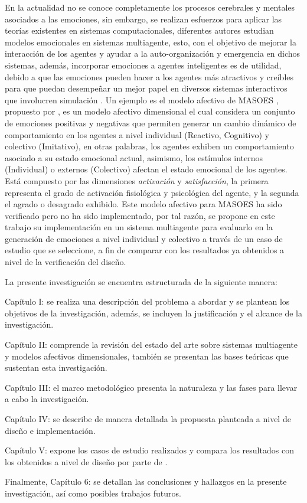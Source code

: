 En la actualidad no se conoce completamente los procesos cerebrales y mentales
asociados a las emociones, sin embargo, se realizan esfuerzos para aplicar las
teorías existentes en sistemas computacionales, diferentes autores estudian
modelos emocionales en sistemas multiagente, esto, con el objetivo de mejorar la
interacción de los agentes y ayudar a la auto-organización y emergencia en
dichos sistemas, además, incorporar emociones a agentes inteligentes
es de utilidad, debido a que las
emociones pueden hacer a los agentes más atractivos y creíbles para que puedan
desempeñar un mejor papel en diversos sistemas interactivos que involucren
simulación \citep{jiang2007}.
Un ejemplo es el modelo afectivo de MASOES , propuesto por
\cite{perozo2011}, es un modelo afectivo dimensional el cual considera un conjunto de emociones positivas y
negativas que permiten generar un cambio dinámico de comportamiento en los
agentes a nivel individual (Reactivo, Cognitivo) y colectivo (Imitativo), en
otras palabras, los agentes exhiben un comportamiento asociado a su estado
emocional actual, asimismo, los estímulos internos (Individual) o externos
(Colectivo) afectan el estado emocional de los agentes.
Está compuesto por las dimensiones \textit{activación} y \textit{satisfacción},
la primera representa el grado de activación fisiológica y psicológica del agente,
y la segunda el agrado o desagrado exhibido. Este modelo afectivo
para MASOES ha sido verificado \citep{perozo2011} pero no ha sido implementado,
por tal razón, se propone en este trabajo su implementación en un sistema
multiagente para evaluarlo en la generación de emociones a nivel individual y
colectivo a través de un caso de estudio que se seleccione, a fin de comparar
con los resultados ya obtenidos a nivel de la verificación del diseño.

La presente investigación se encuentra estructurada de la siguiente manera:

Capítulo I: se realiza una descripción del problema a abordar
y se plantean los objetivos de la investigación, además, se incluyen la
justificación y el alcance de la investigación.

Capítulo II: comprende la revisión del estado del arte
sobre sistemas multiagente y modelos afectivos dimensionales, también se presentan las bases
teóricas que sustentan esta investigación.

Capítulo III: el marco metodológico presenta la naturaleza y las fases para llevar a cabo la
investigación.

Capítulo IV: se describe de manera detallada la propuesta planteada a nivel
de diseño e implementación.

Capítulo V: expone los casos de estudio realizados y compara los resultados con los obtenidos a nivel de diseño
por parte de \cite{perozo2011}.

Finalmente, Capítulo 6: se detallan las conclusiones y hallazgos en la presente investigación, así
como posibles trabajos futuros.
